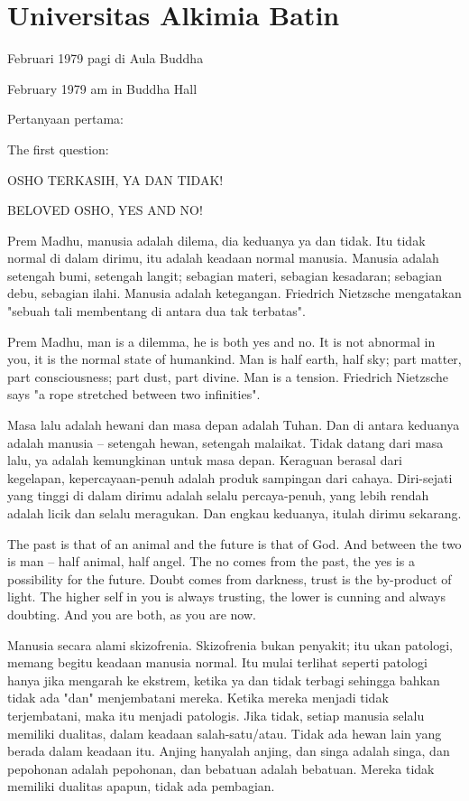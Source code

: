 \chapter{Universitas Alkimia Batin} %

 Februari 1979 pagi di Aula Buddha

 February 1979 am in Buddha Hall

\bahasa
Pertanyaan pertama:

\english
The first question:

\bahasa
OSHO TERKASIH,
YA DAN TIDAK!

\english
BELOVED OSHO,
YES AND NO!

\bahasa
Prem Madhu, manusia adalah dilema, dia keduanya ya dan tidak. Itu tidak normal di dalam dirimu, itu adalah keadaan normal manusia. Manusia adalah setengah bumi, setengah langit; sebagian materi, sebagian kesadaran; sebagian debu, sebagian ilahi. Manusia adalah ketegangan. Friedrich Nietzsche mengatakan "sebuah tali membentang di antara dua tak terbatas".

\english
Prem Madhu, man is a dilemma, he is both yes and no. It is not abnormal in you, it is the normal state of humankind. Man is half earth, half sky; part matter, part consciousness; part dust, part divine. Man is a tension. Friedrich Nietzsche says "a rope stretched between two infinities".

\bahasa
Masa lalu adalah hewani dan masa depan adalah Tuhan. Dan di antara keduanya adalah manusia -- setengah hewan, setengah malaikat. Tidak datang dari masa lalu, ya adalah kemungkinan untuk masa depan. Keraguan berasal dari kegelapan, kepercayaan-penuh adalah produk sampingan dari cahaya. Diri-sejati yang tinggi di dalam dirimu adalah selalu percaya-penuh, yang lebih rendah adalah licik dan selalu meragukan. Dan engkau keduanya, itulah dirimu sekarang.

\english
The past is that of an animal and the future is that of God. And between the two is man -- half animal, half angel. The no comes from the past, the yes is a possibility for the future. Doubt comes from darkness, trust is the by-product of light. The higher self in you is always trusting, the lower is cunning and always doubting. And you are both, as you are now.

\bahasa
Manusia secara alami skizofrenia. Skizofrenia bukan penyakit; itu ukan patologi, memang begitu keadaan manusia normal. Itu mulai terlihat seperti patologi hanya jika mengarah ke ekstrem, ketika ya dan tidak terbagi sehingga bahkan tidak ada "dan" menjembatani mereka. Ketika mereka menjadi tidak terjembatani, maka itu menjadi patologis. Jika tidak, setiap manusia selalu memiliki dualitas, dalam keadaan salah-satu/atau. Tidak ada hewan lain yang berada dalam keadaan itu. Anjing hanyalah anjing, dan singa adalah singa, dan pepohonan adalah pepohonan, dan bebatuan adalah bebatuan. Mereka tidak memiliki dualitas apapun, tidak ada pembagian.

